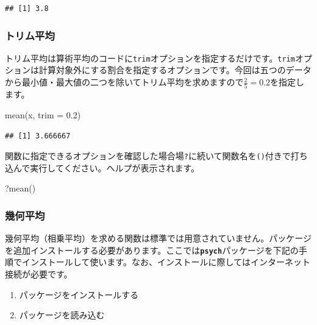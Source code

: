 \documentclass[
  12pt,
]{book}
\newenvironment{Shaded}{\begin{snugshade}}{\end{snugshade}}
\newcommand{\AttributeTok}[1]{\textcolor[rgb]{0.77,0.63,0.00}{#1}}
\newcommand{\FloatTok}[1]{\textcolor[rgb]{0.00,0.00,0.81}{#1}}
\newcommand{\FunctionTok}[1]{\textcolor[rgb]{0.00,0.00,0.00}{#1}}
\newcommand{\NormalTok}[1]{#1}
\providecommand{\tightlist}{%
  \setlength{\itemsep}{0pt}\setlength{\parskip}{0pt}}
\begin{document}
\begin{verbatim}
## [1] 3.8
\end{verbatim}

\hypertarget{ux30c8ux30eaux30e0ux5e73ux5747}{%
\subsubsection{トリム平均}\label{ux30c8ux30eaux30e0ux5e73ux5747}}

トリム平均は算術平均のコードに\texttt{trim}オプションを指定するだけです。\texttt{trim}オプションは計算対象外にする割合を指定するオプションです。今回は五つのデータから最小値・最大値の二つを除いてトリム平均を求めますので\(\frac{2}{5} = 0.2\)を指定します。

\begin{Shaded}
\begin{Highlighting}[]
\FunctionTok{mean}\NormalTok{(x, }\AttributeTok{trim =} \FloatTok{0.2}\NormalTok{)}
\end{Highlighting}
\end{Shaded}

\begin{verbatim}
## [1] 3.666667
\end{verbatim}

関数に指定できるオプションを確認した場合場\texttt{?}に続いて関数名を\texttt{()}付きで打ち込んで実行してください。ヘルプが表示されます。

\begin{Shaded}
\begin{Highlighting}[]
\NormalTok{?}\FunctionTok{mean}\NormalTok{()}
\end{Highlighting}
\end{Shaded}

\hypertarget{ux5e7eux4f55ux5e73ux5747}{%
\subsubsection{幾何平均}\label{ux5e7eux4f55ux5e73ux5747}}

幾何平均（相乗平均）を求める関数は標準では用意されていません。パッケージを追加インストールする必要があります。ここでは\textbf{\texttt{psych}}パッケージを下記の手順でインストールして使います。なお、インストールに際してはインターネット接続が必要です。

\begin{enumerate}
\def\labelenumi{\arabic{enumi}.}
\tightlist
\item
  パッケージをインストールする
\item
  パッケージを読み込む
\end{enumerate}
\end{document}
